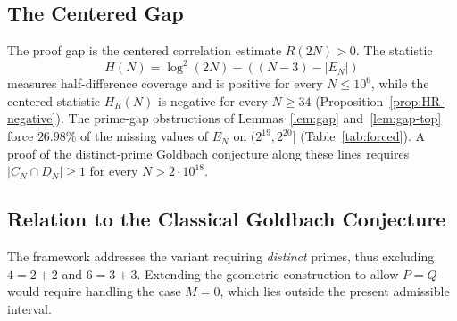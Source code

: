\documentclass[11pt]{amsart}
\theoremstyle{definition}
\theoremstyle{remark}
\begin{document}
\subsection*{The Centered Gap}
The proof gap is the centered correlation estimate $R(2N)>0$. The statistic
\[
H(N)=\log^2(2N)-((N-3)-|E_N|)
\]
measures half-difference coverage and is positive for every $N\leq 10^6$, while the centered statistic $H_R(N)$ is negative for every $N\geq 34$ (Proposition~\ref{prop:HR-negative}). The prime-gap obstructions of Lemmas~\ref{lem:gap} and~\ref{lem:gap-top} force $26.98\%$ of the missing values of $E_N$ on $(2^{19},2^{20}]$ (Table~\ref{tab:forced}). A proof of the distinct-prime Goldbach conjecture along these lines requires $|C_N\cap D_N|\geq 1$ for every $N>2\cdot 10^{18}$.

\subsection*{Relation to the Classical Goldbach Conjecture}
The framework addresses the variant requiring \emph{distinct} primes, thus excluding $4=2+2$ and $6=3+3$. Extending the geometric construction to allow $P=Q$ would require handling the case $M=0$, which lies outside the present admissible interval.
\end{document}
